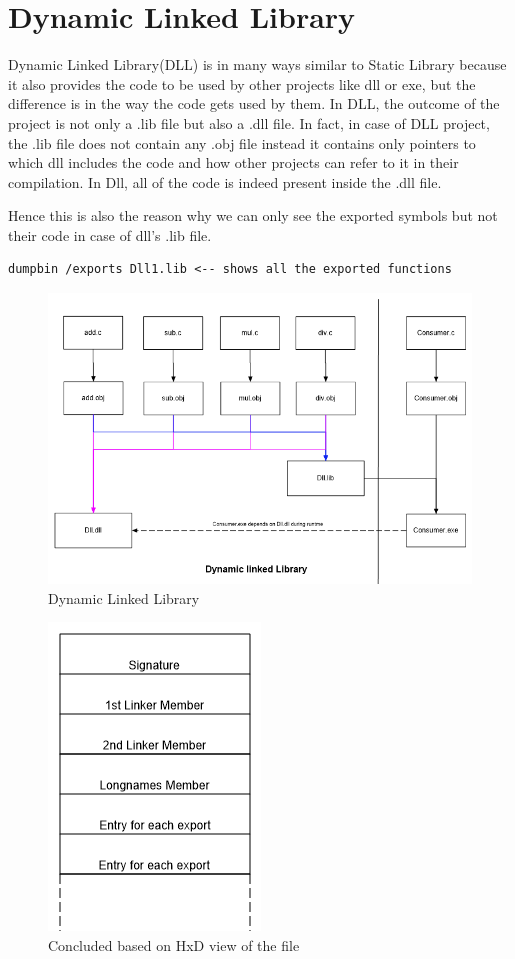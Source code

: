 \documentclass{article}
\begin{document}
\section{Dynamic Linked Library}
Dynamic Linked Library(DLL) is in many ways similar to Static Library because
it also provides the code to be used by other projects like dll or exe,
but the difference is in the way the code gets used by them.
In DLL, the outcome of the project is not only a .lib file but also a
.dll file. In fact, in case of DLL project, the .lib file does not contain
any .obj file instead it contains only pointers to which dll includes
the code and how other projects can refer to it in their compilation.
In Dll, all of the code is indeed present inside the .dll file.

Hence this is also the reason why we can only see the exported symbols
but not their code in case of dll's .lib file.

\begin{verbatim}
dumpbin /exports Dll1.lib <-- shows all the exported functions
\end{verbatim}

\begin{figure}[H]
\centering
\includegraphics[width=\textwidth]{3.Dll.png}
\caption{Dynamic Linked Library}
\end{figure}
\begin{figure}[H]
\centering
\includegraphics{4.StructureDll.png}
\caption{Concluded based on HxD view of the file}
\end{figure}
\end{document}
